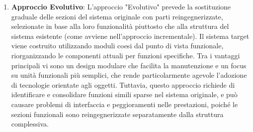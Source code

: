 \begin{enumerate}
  \item \textbf{Approccio Evolutivo}: L'approccio "Evolutivo" prevede la sostituzione graduale delle sezioni del sistema originale con parti reingegnerizzate, selezionate in base alla loro funzionalità piuttosto che alla struttura del sistema esistente (come avviene nell'approccio incrementale). Il sistema target viene costruito utilizzando moduli coesi dal punto di vista funzionale, riorganizzando le componenti attuali per funzioni specifiche. Tra i vantaggi principali vi sono un design modulare che facilita la manutenzione e un focus su unità funzionali più semplici, che rende particolarmente agevole l'adozione di tecnologie orientate agli oggetti. Tuttavia, questo approccio richiede di identificare e consolidare funzioni simili sparse nel sistema originale, e può causare problemi di interfaccia e peggioramenti nelle prestazioni, poiché le sezioni funzionali sono reingegnerizzate separatamente dalla struttura complessiva.
\end{enumerate}

